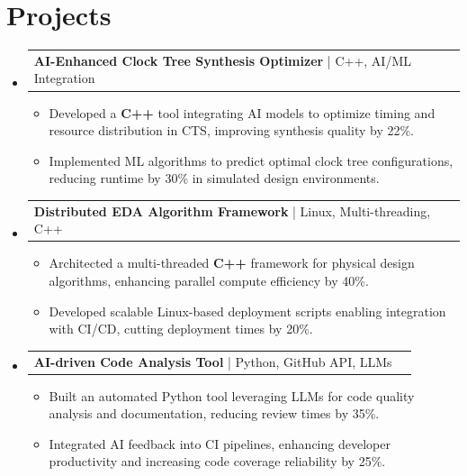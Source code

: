 \documentclass[letterpaper,11pt]{article}
\makeatletter
\newcommand{\resumeItem}[1]{
  \item\footnotesize{
    {#1 \vspace{-2pt}}
  }
}
\newcommand{\resumeProjectHeading}[2]{
    \item
    \begin{tabular*}{1.001\textwidth}{l@{\extracolsep{\fill}}r}
      \small#1 & \textbf{\small #2}\\
    \end{tabular*}\vspace{-7pt}
}
\newcommand{\resumeSubHeadingListStart}{\begin{itemize}[leftmargin=0pt, label={}]}
\newcommand{\resumeSubHeadingListEnd}{\end{itemize}}
\newcommand{\resumeItemListStart}{\begin{itemize}[leftmargin=*]}
\newcommand{\resumeItemListEnd}{\end{itemize}\vspace{-5pt}}
\makeatother
\begin{document}
\section{Projects}
    \vspace{-5pt}
    \resumeSubHeadingListStart
      \resumeProjectHeading
          {\textbf{AI-Enhanced Clock Tree Synthesis Optimizer} | C++, AI/ML Integration}{}
          \resumeItemListStart
              \resumeItem{Developed a \textbf{C++} tool integrating AI models to optimize timing and resource distribution in CTS, improving synthesis quality by 22\%.}
              \resumeItem{Implemented ML algorithms to predict optimal clock tree configurations, reducing runtime by 30\% in simulated design environments.}
          \resumeItemListEnd
          \vspace{-12pt}
      \resumeProjectHeading
          {\textbf{Distributed EDA Algorithm Framework} | Linux, Multi-threading, C++}{}
          \resumeItemListStart
              \resumeItem{Architected a multi-threaded \textbf{C++} framework for physical design algorithms, enhancing parallel compute efficiency by 40\%.}
              \resumeItem{Developed scalable Linux-based deployment scripts enabling integration with CI/CD, cutting deployment times by 20\%.}
          \resumeItemListEnd
          \vspace{-12pt}
      \resumeProjectHeading
          {\textbf{AI-driven Code Analysis Tool} | Python, GitHub API, LLMs}{}
          \resumeItemListStart
              \resumeItem{Built an automated Python tool leveraging LLMs for code quality analysis and documentation, reducing review times by 35\%.}
              \resumeItem{Integrated AI feedback into CI pipelines, enhancing developer productivity and increasing code coverage reliability by 25\%.}
          \resumeItemListEnd 
    \resumeSubHeadingListEnd
\end{document}
